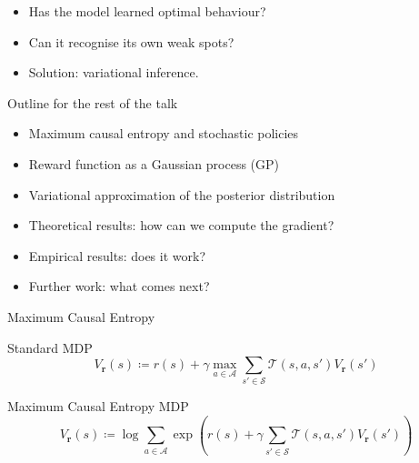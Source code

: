 \documentclass{beamer}
\begin{document}
\begin{frame}
  \begin{itemize}
  \item Has the model learned optimal behaviour?
  \item Can it recognise its own weak spots?
  \item Solution: variational inference.
  \end{itemize}
  \pause
  \begin{block}{Outline for the rest of the talk}
  \begin{itemize}
  \item Maximum causal entropy and stochastic policies
  \item Reward function as a Gaussian process (GP)
  \item Variational approximation of the posterior distribution
  \item Theoretical results: how can we compute the gradient?
  \item Empirical results: does it work?
  \item Further work: what comes next?
  \end{itemize}
  \end{block}
\end{frame}


\begin{frame}{Maximum Causal Entropy}
  \begin{minipage}[t]{\textwidth}
    \begin{block}{Standard MDP}
      \[
        V_{\mathbf{r}}(s) \coloneqq r(s) + \gamma \max_{a \in \mathcal{A}}
        \sum_{s' \in \mathcal{S}} \mathcal{T}(s, a, s')V_{\mathbf{r}}(s')
      \]
    \end{block}
    \begin{block}{Maximum Causal Entropy MDP}
      \[
        V_{\mathbf{r}}(s) \coloneqq \log \sum_{a \in \mathcal{A}} \exp \left(
          r(s) + \gamma\sum_{s' \in \mathcal{S}} \mathcal{T}(s, a,
          s')V_{\mathbf{r}}(s') \right)
      \]
    \end{block}
    \vspace{1cm}
  \end{minipage}
\end{frame}
\end{document}
